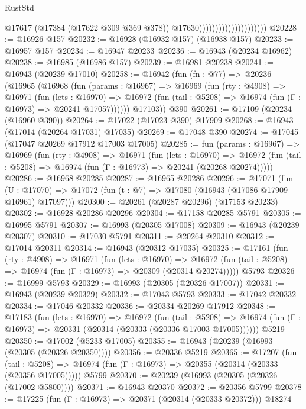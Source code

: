 \begin{lexlean}{RustStd}
\begin{coremodule}
                                              @17617
                                              (@17384 (@17622 @309 @369 @378))
                                              @17630)))))))))))))))))))))
@20228 := @16926 @157
@20232 := @16928 (@16932 @157) (@16938 @157)
@20233 := @16957 @157
@20234 := @16947 @20233
@20236 := @16943 (@20234 @16962)
@20238 := @16985 (@16986 @157)
@20239 := @16981 @20238
@20241 := @16943 (@20239 @17010)
@20258 := @16942
    (fun (fn : @77) =>
    @20236
      (@16965
        (@16968
          (fun (params : @16967) =>
          @16969
            (fun (rty : @4908) =>
            @16971
              (fun (lets : @16970) =>
              @16972 (fun (tail : @5208) => @16974 (fun (Γ : @16973) => @20241 @17057))))))
        @17103))
    @390
@20261 := @17109 (@20234 (@16960 @390))
@20264 := @17022 (@17023 @390) @17909
@20268 := @16943 (@17014 (@20264 @17031) @17035)
@20269 := @17048 @390
@20274 := @17045 (@17047 @20269 @17912 @17003 @17005)
@20285 := fun (params : @16967) =>
  @16969
    (fun (rty : @4908) =>
    @16971
      (fun (lets : @16970) =>
      @16972 (fun (tail : @5208) => @16974 (fun (Γ : @16973) => @20241 (@20268 @20274)))))
@20286 := @16968 @20285
@20287 := @16965 @20286
@20296 := @17071
    (fun (U : @17070) => @17072 (fun (t : @7) => @17080 (@16943 (@17086 @17909 @16961) @17097)))
@20300 := @20261 (@20287 @20296) (@17153 @20233)
@20302 := @16928 @20286 @20296
@20304 := @17158 @20285 @5791
@20305 := @16995 @5791
@20307 := @16993 (@20305 @17008)
@20309 := @16943 (@20239 @20307)
@20310 := @17030 @5791
@20311 := @20264 @20310
@20312 := @17014 @20311
@20314 := @16943 (@20312 @17035)
@20325 := @17161
    (fun (rty : @4908) =>
    @16971
      (fun (lets : @16970) =>
      @16972 (fun (tail : @5208) => @16974 (fun (Γ : @16973) => @20309 (@20314 @20274)))))
    @5793
@20326 := @16999 @5793
@20329 := @16993 (@20305 (@20326 @17007))
@20331 := @16943 (@20239 @20329)
@20332 := @17043 @5793
@20333 := @17042 @20332
@20334 := @17046 @20332
@20336 := @20334 @20269 @17912
@20348 := @17183
    (fun (lets : @16970) =>
    @16972
      (fun (tail : @5208) =>
      @16974 (fun (Γ : @16973) => @20331 (@20314 (@20333 (@20336 @17003 @17005))))))
    @5219
@20350 := @17002 (@5233 @17005)
@20355 := @16943 (@20239 (@16993 (@20305 (@20326 @20350))))
@20356 := @20336 @5219
@20365 := @17207
    (fun (tail : @5208) => @16974 (fun (Γ : @16973) => @20355 (@20314 (@20333 (@20356 @17005)))))
    @5799
@20370 := @20239 (@16993 (@20305 (@20326 (@17002 @5800))))
@20371 := @16943 @20370
@20372 := @20356 @5799
@20378 := @17225 (fun (Γ : @16973) => @20371 (@20314 (@20333 @20372))) @18274

\end{coremodule}
\end{lexlean}
